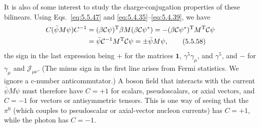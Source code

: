It is also of some interest to study the charge-conjugation properties of these
bilinears. Using Eqs.~\eqref{eq:5.5.47} and \eqref{eq:5.4.35}--\eqref{eq:5.4.39}, we have
\begin{align}
C(\bar\psi M\psi)C^{-1}
&=(\beta\mathcal{C}\psi)^{\mathrm T}\beta M(\beta\mathcal{C}\psi^*)
=-(\beta\mathcal{C}\psi^*)^{\mathrm T}M^{\mathrm T}\mathcal{C}\psi
\notag\\
&=\bar\psi\mathcal{C}^{-1}M^{\mathrm T}\mathcal{C}\psi
=\mathbin{\pm}\bar\psi M\psi,
\tag{5.5.58}\label{eq:5.5.58}
\end{align}
the sign in the last expression being $+$ for the matrices $\mathbf{1}$,
$\gamma^5\gamma_\mu$, and $\gamma^5$, and $-$ for $\gamma_\mu$ and
$\mathcal{J}_{\mu\nu}$. (The minus sign in the first line arises from Fermi
statistics. We ignore a c-number anticommutator.) A boson field that interacts
with the current $\bar\psi M\psi$ must therefore have $C=+1$ for scalars,
pseudoscalars, or axial vectors, and $C=-1$ for vectors or antisymmetric
tensors. This is one way of seeing that the $\pi^0$ (which couples to
pseudoscalar or axial-vector nucleon currents) has $C=+1$, while the photon
has $C=-1$.
